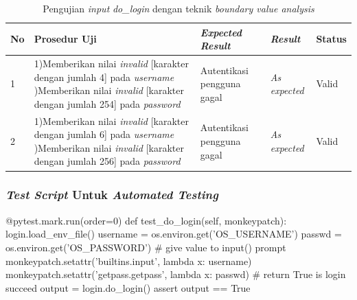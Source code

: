 \begin{longtable}{|P{.06\textwidth}|P{.30\textwidth}|P{.30\textwidth}|P{.10\textwidth}|P{.08\textwidth}|}
  \caption{Pengujian  \emph{input} \emph{do\_login} dengan teknik \emph{boundary value analysis}} \label{jalur:login-bva}\\
  \hline
  \textbf{No} & \textbf{Prosedur Uji} & \textbf{\emph{Expected Result}} & \textbf{\emph{Result}} & \textbf{Status} \\\hline
  1 & 1)Memberikan nilai \emph{invalid} [karakter dengan jumlah 4] pada \emph{username} )Memberikan nilai \emph{invalid} [karakter dengan jumlah 254] pada \emph{password}
                                      & Autentikasi pengguna gagal
                                                                        & \emph{As expected} & Valid \\\hline
  2 & 1)Memberikan nilai \emph{invalid} [karakter dengan jumlah 6] pada \emph{username} )Memberikan nilai \emph{invalid} [karakter dengan jumlah 256] pada \emph{password}
                                      & Autentikasi pengguna gagal
                                                                        & \emph{As expected} & Valid \\\hline
\end{longtable}


\subsubsection{\emph{Test Script} Untuk \emph{Automated Testing}}

\begin{code}
\begin{ignasicblock}[title=test\_do\_login,minted language=Python]
@pytest.mark.run(order=0)
def test_do_login(self, monkeypatch):
    login.load_env_file()
    username = os.environ.get('OS_USERNAME')
    passwd = os.environ.get('OS_PASSWORD')
    # give value to input() prompt
    monkeypatch.setattr('builtins.input', lambda x: username)
    monkeypatch.setattr('getpass.getpass', lambda x: passwd)
    # return True is login succeed
    output = login.do_login()
    assert output == True
\end{ignasicblock}
\label{ts:login}
\end{code}

